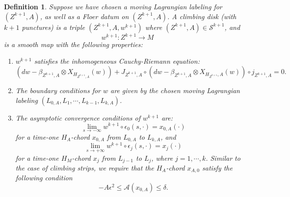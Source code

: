 \documentclass{amsart}
\newtheorem{definition}[theorem]{Definition}
\numberwithin{equation}{section}
\numberwithin{figure}{section}
\begin{document}
\begin{definition}
	Suppose we have chosen a moving Lagrangian labeling for $(Z^{k+1}, A)$, as well as a Floer datum on $(Z^{k+1}, A)$. A climbing disk (with $k+1$ punctures) is a triple $(Z^{k+1}, A, w^{k+1})$ where $(Z^{k+1}, A) \in \mathcal{S}^{k+1}$, and
\begin{equation*}
w^{k+1}: Z^{k+1} \to M
\end{equation*}
is a smooth map with the following properties:
\begin{enumerate}[label=(\roman*)]

\item $w^{k+1}$ satisfies the inhomogeneous Cauchy-Riemann equation:
\begin{equation}
(dw - \beta_{Z^{k+1}, A} \otimes X_{H_{Z^{k+1}, A}}(w)) + J_{Z^{k+1}, A} \circ (dw - \beta_{Z^{k+1}, A} \otimes X_{H_{Z^{k+1}}, A}(w)) \circ j_{Z^{k+1}, A} = 0.
\end{equation}

\item The boundary conditions for $w$ are given by the chosen moving Lagrangian labeling $(L_{0, A}, L_{1}, \cdots, L_{k-1}, L_{k, A})$.

\item The asymptotic convergence conditions of $w^{k+1}$ are:
\begin{equation*}
\lim\limits_{s \to -\infty} w^{k+1} \circ \epsilon_{0}(s, \cdot) = x_{0, A}(\cdot)
\end{equation*}
for a time-one $H_{A}$-chord $x_{0, A}$ from $L_{0, A}$ to $L_{k, A}$,
and
\begin{equation*}
\lim\limits_{s \to +\infty} w^{k+1} \circ \epsilon_{j}(s, \cdot) = x_{j}(\cdot)
\end{equation*}
for a time-one $H_{M}$-chord $x_{j}$ from $L_{j-1}$ to $L_{j}$, where $j = 1, \cdots, k$. Similar to the case of climbing strips, we require that the $H_{A}$-chord $x_{A, 0}$ satisfy the following condition
\begin{equation*}
-A\epsilon^{2} \le \mathcal{A}(x_{0, A}) \le \delta.
\end{equation*}

\end{enumerate}
\end{definition}
\end{document}
